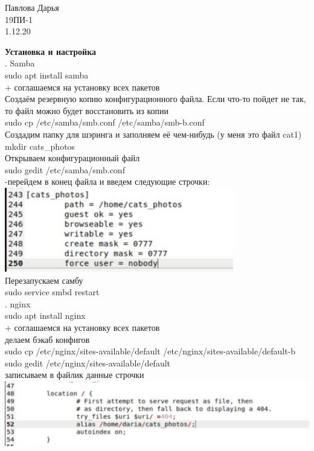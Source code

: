 \documentclass[12pt,a4paper]{scrartcl}
\author{Даря}
\begin{document}
\begin{flushright}
  Павлова Дарья\\
  19ПИ-1\\
  1.12.20\\
\end{flushright}

\textbf{Установка и настройка}
\\[5pt]
. Samba
\\[5pt]
sudo apt install samba
\\[5pt]
+ соглашаемся на установку всех пакетов
\\[5pt]
Создаём резервную копию конфигурационного файла. Если что-то пойдет не так, то файл можно будет восстановить из копии
\\[5pt]
sudo cp /etc/samba/smb.conf /etc/samba/smb-b.conf
\\[5pt]
Создадим папку для шэринга и заполняем её чем-нибудь (у меня это файл cat1)
\\[5pt]
mkdir cats\_photos
\\[5pt]
Открываем конфигурационный файл 
\\[5pt]
sudo gedit /etc/samba/smb.conf 
\\[5pt]
-перейдем в конец файла и введем следующие строчки:
\\[5pt]
\includegraphics[scale=10, width=10cm]{f1}
\\[5pt]
Перезапускаем самбу
\\[5pt]
sudo service smbd restart
\\[5pt]
. nginx
\\[5pt]
sudo apt install nginx
\\[5pt]
+ соглашаемся на установку всех пакетов
\\[5pt]
делаем бэкаб конфигов
\\[5pt]
sudo cp /etc/nginx/sites-available/default /etc/nginx/sites-available/default-b
\\[5pt]
sudo gedit /etc/nginx/sites-available/default
\\[5pt]
записываем в файлик данные строчки 
\\[5pt]
\includegraphics[scale=10, width=15cm]{f2}
\end{document}
